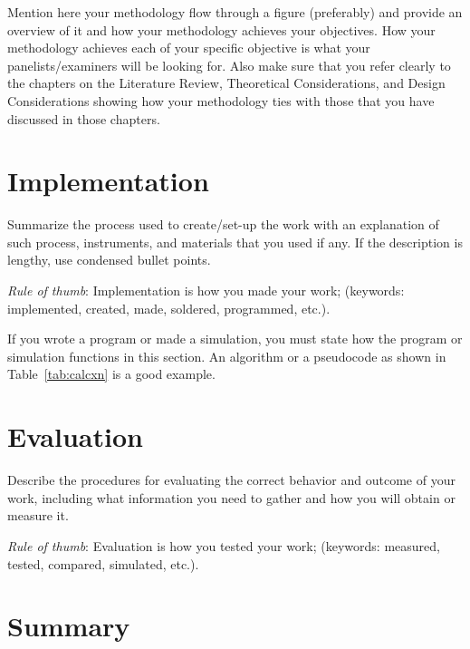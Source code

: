 Mention here your methodology flow through a figure (preferably) and provide an overview of it and how your methodology achieves your objectives.  How your methodology achieves each of your specific objective is what your panelists/examiners will be looking for. 
Also make sure that you refer clearly to the chapters on the Literature Review, Theoretical Considerations, and Design Considerations showing how your methodology ties with those that you have discussed in those chapters.


\section{Implementation}

Summarize the process used to create/set-up the work with an explanation of such process, instruments, and materials that you used if any. If the description is lengthy, use condensed bullet points. 

\noindent \textit{Rule of thumb}: Implementation is how you made your  work; (keywords: implemented, created, made, soldered, programmed, etc.).

If you wrote a program or made a simulation, you must state how the program or simulation functions in this section.	An algorithm or a pseudocode as shown in Table~\ref{tab:calcxn} is a good example.


\textcolor[rgb]{0.75,0.75,0.75}{\Blindtext}



\section{Evaluation}

Describe the procedures for evaluating the correct behavior and outcome of your  work, including what information you need to gather and how you will obtain or measure it.  

\textit{Rule of thumb}: Evaluation is how you tested your  work; (keywords: measured, tested, compared, simulated, etc.).

\textcolor[rgb]{0.75,0.75,0.75}{\Blindtext}



\section{Summary}
